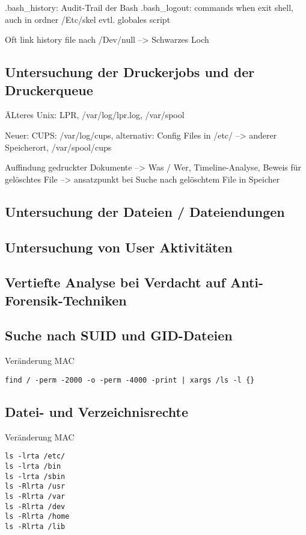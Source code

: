 .bash\_history: Audit-Trail der Bash
.bash\_logout: commands when exit shell, auch in ordner /Etc/skel evtl. globales script

Oft link history file nach /Dev/null --> Schwarzes Loch

\subsection{Untersuchung der Druckerjobs und der Druckerqueue}
ÄLteres Unix: LPR, /var/log/lpr.log, /var/spool

Neuer: CUPS: /var/log/cups, alternativ: Config Files in /etc/ --> anderer Speicherort, /var/spool/cups

Auffindung gedruckter Dokumente --> Was / Wer, Timeline-Analyse, Beweis für gelöschtes File --> ansatzpunkt bei Suche nach gelöschtem File in Speicher

\subsection{Untersuchung der Dateien / Dateiendungen}

\subsection{Untersuchung von User Aktivitäten}

\subsection{Vertiefte Analyse bei Verdacht auf Anti-Forensik-Techniken}

\subsection{Suche nach SUID und GID-Dateien}
Veränderung MAC
\begin{lstlisting}
find / -perm -2000 -o -perm -4000 -print | xargs /ls -l {}
\end{lstlisting}

\subsection{Datei- und Verzeichnisrechte}
Veränderung MAC
\begin{lstlisting}
ls -lrta /etc/
ls -lrta /bin
ls -lrta /sbin
ls -Rlrta /usr
ls -Rlrta /var
ls -Rlrta /dev
ls -Rlrta /home
ls -Rlrta /lib
\end{lstlisting}

